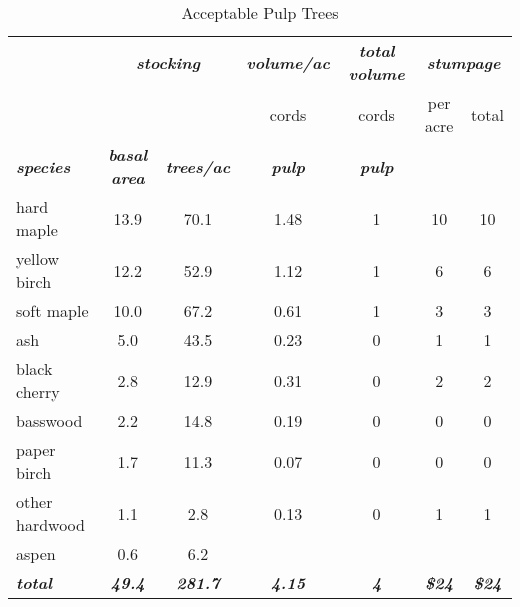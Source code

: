 \documentclass[landscape]{article}
\begin{document}
\begin{table}[H]

\caption{\label{tab:unnamed-chunk-63}Acceptable Pulp Trees}
\fontsize{10}{12}\selectfont
\begin{tabular}[t]{lcccccc}
\toprule
\multicolumn{1}{c}{\em{\textbf{ }}} & \multicolumn{2}{c}{\em{\textbf{stocking}}} & \multicolumn{1}{c}{\em{\textbf{volume/ac }}} & \multicolumn{1}{c}{\em{\textbf{total volume}}} & \multicolumn{2}{c}{\em{\textbf{stumpage}}} \\
\cmidrule(l{3pt}r{3pt}){2-3} \cmidrule(l{3pt}r{3pt}){4-4} \cmidrule(l{3pt}r{3pt}){5-5} \cmidrule(l{3pt}r{3pt}){6-7}
\multicolumn{3}{c}{ } & \multicolumn{1}{c}{cords} & \multicolumn{1}{c}{cords} & \multicolumn{1}{c}{per acre} & \multicolumn{1}{c}{total} \\
\cmidrule(l{3pt}r{3pt}){4-4} \cmidrule(l{3pt}r{3pt}){5-5} \cmidrule(l{3pt}r{3pt}){6-6} \cmidrule(l{3pt}r{3pt}){7-7}
\rowcolor[HTML]{DCDCDC}  \em{\textbf{species}} & \em{\textbf{basal area}} & \em{\textbf{trees/ac}} & \em{\textbf{pulp}} & \em{\textbf{pulp}} & \em{\textbf{ }} & \em{\textbf{ }}\\
\midrule
\rowcolor{gray!6}  hard maple & 13.9 & 70.1 & 1.48 & 1 & 10 & 10\\
 
yellow birch & 12.2 & 52.9 & 1.12 & 1 & 6 & 6\\
 
\rowcolor{gray!6}  soft maple & 10.0 & 67.2 & 0.61 & 1 & 3 & 3\\
 
ash & 5.0 & 43.5 & 0.23 & 0 & 1 & 1\\
 
\rowcolor{gray!6}  black cherry & 2.8 & 12.9 & 0.31 & 0 & 2 & 2\\
 
basswood & 2.2 & 14.8 & 0.19 & 0 & 0 & 0\\
 
\rowcolor{gray!6}  paper birch & 1.7 & 11.3 & 0.07 & 0 & 0 & 0\\
 
other hardwood & 1.1 & 2.8 & 0.13 & 0 & 1 & 1\\
 
\rowcolor{gray!6}  aspen & 0.6 & 6.2 &  &  &  & \\
 
\rowcolor[HTML]{DCDCDC}  \em{\textbf{total}} & \em{\textbf{49.4}} & \em{\textbf{281.7}} & \em{\textbf{4.15}} & \em{\textbf{4}} & \em{\textbf{\$24}} & \em{\textbf{\$24}}\\
\bottomrule
\end{tabular}
\end{table}
\end{document}
